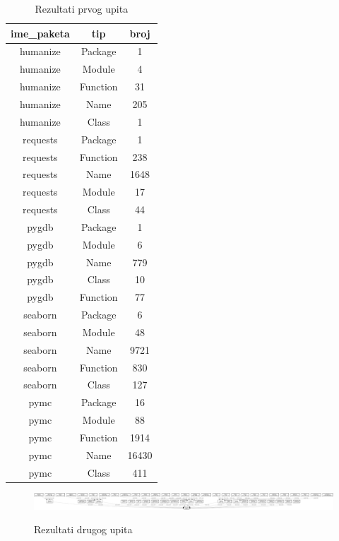 \begin{table}[h]
\centering
\caption{Rezultati prvog upita}
\label{tab:upit1}
\begin{tabular}{|c|c|c|}
\hline
ime_paketa & tip & broj \\ \hline
humanize & Package & 1 \\ \hline
humanize & Module & 4 \\ \hline
humanize & Function & 31 \\ \hline
humanize & Name & 205 \\ \hline
humanize & Class & 1 \\ \hline
requests & Package & 1 \\ \hline
requests & Function & 238 \\ \hline
requests & Name & 1648 \\ \hline
requests & Module & 17 \\ \hline
requests & Class & 44 \\ \hline
pygdb & Package & 1 \\ \hline
pygdb & Module & 6 \\ \hline
pygdb & Name & 779 \\ \hline
pygdb & Class & 10 \\ \hline
pygdb & Function & 77 \\ \hline
seaborn & Package & 6 \\ \hline
seaborn & Module & 48 \\ \hline
seaborn & Name & 9721 \\ \hline
seaborn & Function & 830 \\ \hline
seaborn & Class & 127 \\ \hline
pymc & Package & 16 \\ \hline
pymc & Module & 88 \\ \hline
pymc & Function & 1914 \\ \hline
pymc & Name & 16430 \\ \hline
pymc & Class & 411 \\ \hline
\end{tabular}
\end{table}

\begin{figure}[h]
    \includegraphics[angle=-90, scale=0.12]{assets/pim.png}
    \label{fig:upit2}
    \centering
    \caption{Rezultati drugog upita}
\end{figure}


